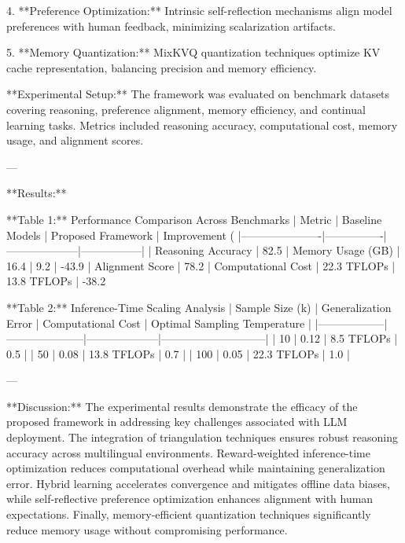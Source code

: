 4. **Preference Optimization:**  
   Intrinsic self-reflection mechanisms align model preferences with human feedback, minimizing scalarization artifacts.  

5. **Memory Quantization:**  
   MixKVQ quantization techniques optimize KV cache representation, balancing precision and memory efficiency.  

**Experimental Setup:**  
The framework was evaluated on benchmark datasets covering reasoning, preference alignment, memory efficiency, and continual learning tasks. Metrics included reasoning accuracy, computational cost, memory usage, and alignment scores.  

---

**Results:**  

**Table 1:** Performance Comparison Across Benchmarks  
| Metric               | Baseline Models | Proposed Framework | Improvement (%
|----------------------|----------------|--------------------|-----------------|  
| Reasoning Accuracy   | 82.5%
| Memory Usage (GB)    | 16.4           | 9.2               | -43.9%
| Alignment Score      | 78.2%
| Computational Cost   | 22.3 TFLOPs    | 13.8 TFLOPs       | -38.2%

**Table 2:** Inference-Time Scaling Analysis  
| Sample Size (k) | Generalization Error | Computational Cost | Optimal Sampling Temperature |  
|------------------|---------------------|--------------------|-----------------------------|  
| 10              | 0.12                | 8.5 TFLOPs         | 0.5                         |  
| 50              | 0.08                | 13.8 TFLOPs        | 0.7                         |  
| 100             | 0.05                | 22.3 TFLOPs        | 1.0                         |  

---

**Discussion:**  
The experimental results demonstrate the efficacy of the proposed framework in addressing key challenges associated with LLM deployment. The integration of triangulation techniques ensures robust reasoning accuracy across multilingual environments. Reward-weighted inference-time optimization reduces computational overhead while maintaining generalization error. Hybrid learning accelerates convergence and mitigates offline data biases, while self-reflective preference optimization enhances alignment with human expectations. Finally, memory-efficient quantization techniques significantly reduce memory usage without compromising performance.  

